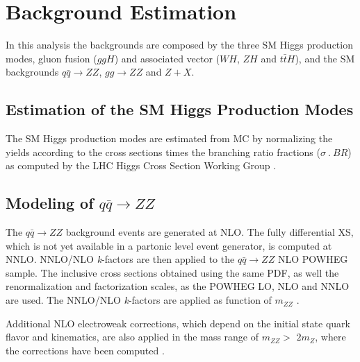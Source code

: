 \chapter{Background Estimation}
\label{sec:bkg_estimation}
In this analysis the backgrounds are composed by the three SM Higgs production modes, gluon fusion ($ggH$) and associated vector ($WH$, $ZH$ and $t\bar{t}H$), and the SM backgrounds $q\bar{q} \rightarrow ZZ$, $gg \rightarrow ZZ$ and $Z+X$.

\section{Estimation of the SM Higgs Production Modes}
\label{sec:smhiggs_other_modes}
The SM Higgs production modes are estimated from MC by normalizing the yields according to the cross sections times the branching ratio fractions ($\sigma~.~BR$) as computed by the LHC Higgs Cross Section Working Group \cite{bib:CMS-AN-16-328}.

\section{Modeling of $q\bar{q} \rightarrow ZZ$}
\label{sec:qqzz_modeling}
The $q\bar{q} \rightarrow ZZ$ background events are generated at NLO. The fully differential XS, which is not yet available in a partonic level event generator, is computed at NNLO. NNLO/NLO \textit{k}-factors are then applied to the $q\bar{q} \rightarrow ZZ$ NLO POWHEG sample. The inclusive cross sections obtained using the same PDF, as well the renormalization and factorization scales, as the POWHEG LO, NLO and NNLO are used. The NNLO/NLO \textit{k}-factors are applied as function of $m_{ZZ}$ \cite{bib:CMS-AN-16-328, bib:CMS-AN-16-442}.

Additional NLO electroweak corrections, which depend on the initial state quark flavor and kinematics, are also applied in the mass range of $m_{ZZ} >$ $2m_{Z}$, where the corrections have been computed \cite{bib:CMS-AN-16-442}.

